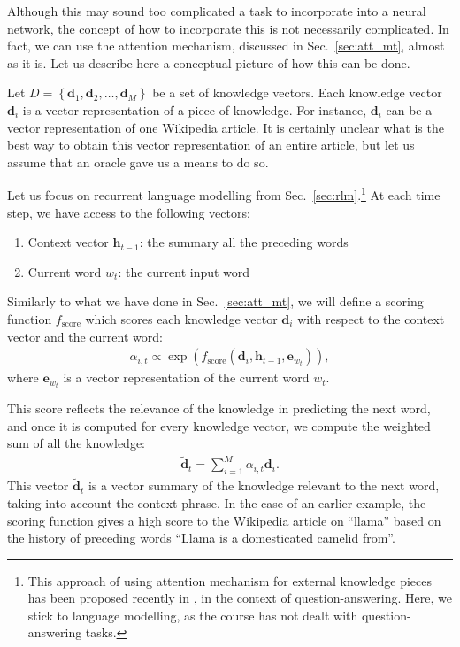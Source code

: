 \documentclass{report}
\newcommand{\vect}[1]{\mathbf{#1}}
\newcommand{\ve}[0]{\vect{e}}
\newcommand{\vh}[0]{\vect{h}}
\newcommand{\vd}[0]{\vect{d}}
\begin{document}
Although this may sound too complicated a task to incorporate into a neural
network, the concept of how to incorporate this is not necessarily complicated.
In fact, we can use the attention mechanism, discussed in Sec.~\ref{sec:att_mt},
almost as it is. Let us describe here a conceptual picture of how this can be
done.

Let $D=\left\{ \vd_1, \vd_2, \ldots, \vd_M \right\}$ be a set of knowledge
vectors. Each knowledge vector $\vd_i$ is a vector representation of a piece of
knowledge. For instance, $\vd_i$ can be a vector representation of one Wikipedia
article. It is certainly unclear what is the best way to obtain this vector
representation of an entire article, but let us assume that an oracle gave us a
means to do so.

Let us focus on recurrent language modelling from Sec.~\ref{sec:rlm}.\footnote{ 
    This approach of using attention mechanism for external knowledge pieces has
    been proposed recently in \citet{bordes2015large}, in the context of
    question-answering. Here, we stick to language modelling, as the course has
    not dealt with question-answering tasks.
}
At each time step, we have access to the following vectors:
\begin{enumerate}
    \itemsep 0em
    \item Context vector $\vh_{t-1}$: the summary all the preceding words
    \item Current word $w_t$: the current input word
\end{enumerate}
Similarly to what we have done in Sec.~\ref{sec:att_mt}, we will define a
scoring function $f_{\text{score}}$ which scores each knowledge vector $\vd_i$ with respect to
the context vector and the current word: 
\begin{align*}
    \alpha_{i,t} \propto \exp\left( f_{\text{score}}(\vd_i, \vh_{t-1}, \ve_{w_t}) \right),
\end{align*}
where $\ve_{w_t}$ is a vector representation of the current word $w_t$.  

This score reflects the relevance of the knowledge in predicting the next word,
and once it is computed for every knowledge vector, we compute the weighted sum
of all the knowledge:
\begin{align*}
    \tilde{\vd}_t = \sum_{i=1}^M \alpha_{i,t} \vd_i.
\end{align*}
This vector $\tilde{\vd}_t$ is a vector summary of the knowledge relevant to the
next word, taking into account the context phrase. In the case of an earlier
example, the scoring function gives a high score to the Wikipedia article on
``llama'' based on the history of preceding words ``Llama is a domesticated
camelid from''. 
\end{document}
